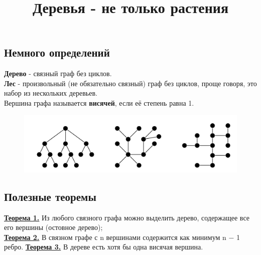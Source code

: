 \documentclass[a4paper,12pt]{article}
\title{Деревья - не только растения}
\begin{document}
\maketitle
    \subsection*{Немного определений}
    \textbf{Дерево} - связный граф без циклов. \\
    \textbf{Лес} - произвольный (не обязательно связный) граф без циклов, проще говоря, это набор из нескольких деревьев.\\ 
    Вершина графа называется \textbf{висячей}, если её степень равна 1.
    \begin{figure}[h]
        \centering
        \includegraphics[width=0.5\linewidth]{image.png}
    \end{figure}
    \subsection*{Полезные теоремы}
    \underline{\textbf{Теорема 1.}} Из любого связного графа можно выделить дерево, содержащее все его вершины (остовное дерево); \\
    \textbf{\underline{Теорема 2.}} В связном графе с n вершинами содержится как минимум n − 1 ребро.
    \textbf{\underline{Теорема 3.}} В дереве есть хотя бы одна висячая вершина.
\end{document}
